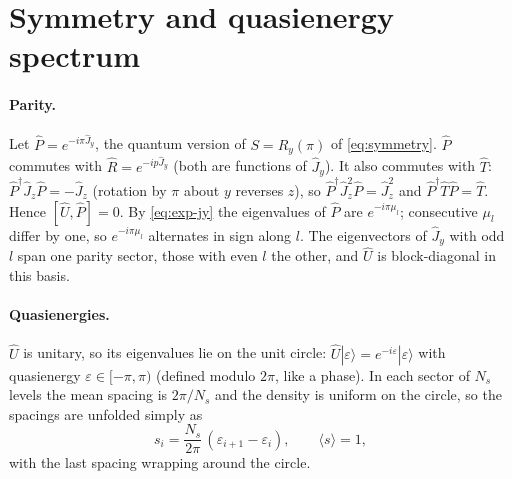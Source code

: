 \documentclass[11pt,a4paper]{article}
\begin{document}
\section{Symmetry and quasienergy spectrum}\label{sec:qspectrum}

\paragraph{Parity.} Let $\hat P = e^{-i\pi\hat J_y}$, the quantum version of $S = R_y(\pi)$ of \eqref{eq:symmetry}.
$\hat P$ commutes with $\hat R = e^{-ip\hat J_y}$ (both are functions of $\hat J_y$). It also commutes with $\hat T$: $\hat
P^\dagger\hat J_z\hat P = -\hat J_z$ (rotation by $\pi$ about $y$ reverses $z$), so $\hat P^\dagger\hat J_z^2\hat P = \hat
J_z^2$ and $\hat P^\dagger\hat T\hat P = \hat T$. Hence $[\hat U, \hat P] = 0$. By \eqref{eq:exp-jy} the eigenvalues of
$\hat P$ are $e^{-i\pi\mu_l}$; consecutive $\mu_l$ differ by one, so $e^{-i\pi\mu_l}$ alternates in sign along $l$. The
eigenvectors of $\hat J_y$ with odd $l$ span one parity sector, those with even $l$ the other, and $\hat U$ is
block-diagonal in this basis.

\paragraph{Quasienergies.} $\hat U$ is unitary, so its eigenvalues lie on the unit circle:
$\hat U|\varepsilon\rangle = e^{-i\varepsilon}|\varepsilon\rangle$ with quasienergy $\varepsilon \in [-\pi, \pi)$
(defined modulo $2\pi$, like a phase). In each sector of $N_s$ levels the mean spacing is $2\pi/N_s$ and the density is
uniform on the circle, so the spacings are unfolded simply as
\begin{equation}\label{eq:unfold}
  s_i = \frac{N_s}{2\pi}\,(\varepsilon_{i+1} - \varepsilon_i), \qquad \langle s\rangle = 1 ,
\end{equation}
with the last spacing wrapping around the circle.
\end{document}
